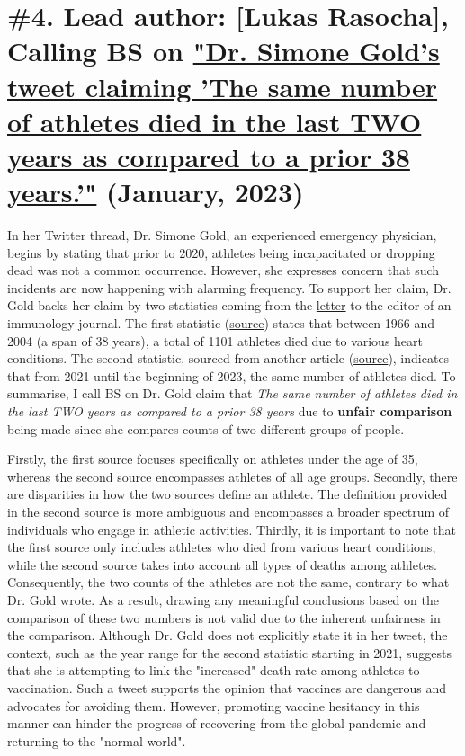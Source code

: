 \documentclass[fleqn,12pt]{article}
\begin{document}
\section{\#4. Lead author: [Lukas Rasocha], Calling BS on \href{https://twitter.com/drsimonegold/status/1610361145294000131?s=20}{"Dr. Simone Gold's tweet claiming 'The same number of athletes died in the last TWO years as 
compared to a prior 38 years.'"} (January, 2023)}
In her Twitter thread, Dr. Simone Gold, an experienced emergency physician, begins by stating that prior to 2020, athletes being incapacitated or dropping dead was not a common occurrence. 
However, she expresses concern that such incidents are now happening with alarming frequency. To support her claim, Dr. Gold backs her claim by two statistics coming from the \href{https://www.ncbi.nlm.nih.gov/pmc/articles/PMC9877705/}{letter} 
to the editor of an immunology journal. The first statistic (\href{https://academic.oup.com/eurjpc/article/13/6/859/5932831}{source}) states that between 1966 and 2004 (a span of 38 years), a total of 1101 athletes died due to various heart conditions. 
The second statistic, sourced from another article (\href{https://goodsciencing.com/covid/athletes-suffer-cardiac-arrest-die-after-covid-shot/}{source}), indicates that from 2021 until the beginning of 2023, the same number of athletes died. 
To summarise, I call BS on Dr. Gold claim that \textit{The same number of athletes died in the last TWO years as compared to a prior 38 years} due to \textbf{unfair comparison} being made since she compares counts of two different 
groups of people.

Firstly, the first source focuses specifically on athletes under the age of 35, whereas the second source encompasses athletes of all age groups. 
Secondly, there are disparities in how the two sources define an athlete. The definition provided in the second source is more ambiguous and encompasses a 
broader spectrum of individuals who engage in athletic activities. Thirdly, it is important to note that the first source only includes athletes who died from various heart conditions, while the second source takes into account all types of deaths among athletes. 
Consequently, the two counts of the athletes are not the same, contrary to what Dr. Gold wrote.
As a result, drawing any meaningful conclusions based on the comparison of these two numbers is not valid due to the inherent unfairness
in the comparison. Although Dr. Gold does not explicitly state it in her tweet, the context, such as the year range for the second statistic starting in 2021, 
suggests that she is attempting to link the "increased" death rate among athletes to vaccination.
Such a tweet supports the opinion that vaccines are dangerous and advocates for avoiding them. 
However, promoting vaccine hesitancy in this manner can hinder the progress of recovering from the global pandemic and returning to the "normal world".
\newpage
\end{document}
